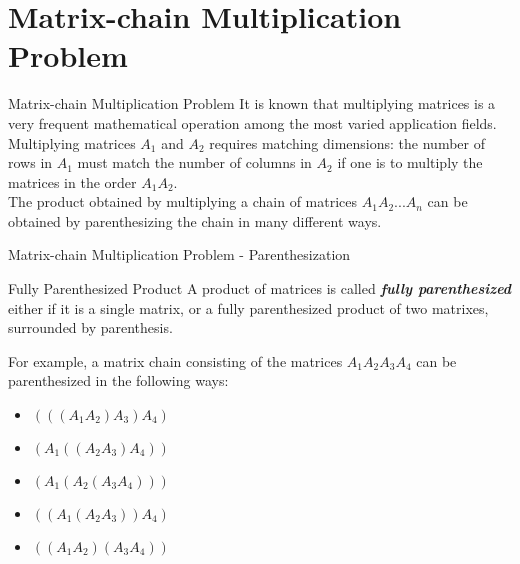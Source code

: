 \section{Matrix-chain Multiplication Problem}


\begin{frame}{Matrix-chain Multiplication Problem}
  It is known that multiplying matrices is a very frequent mathematical
  operation among the most varied application fields. Multiplying matrices 
  $A_1$ and $A_2$ requires matching dimensions: the number of rows in $A_1$
  must match the number of columns in $A_2$ if one is to multiply the matrices 
  in the order $A_{1}A_{2}$.
  \\
  \vspace{2em}
  The product obtained by multiplying a chain of matrices $A_{1}A_{2}...A_{n}$ 
  can be obtained by parenthesizing the chain in many different ways.
\end{frame}


\begin{frame}{Matrix-chain Multiplication Problem - Parenthesization}
  \begin{block}{Fully Parenthesized Product}
    A product of matrices is called \textbf{\emph{fully parenthesized}}
    either if it is a single matrix, or a fully parenthesized product of two matrixes, 
    surrounded by parenthesis.
  \end{block}
  \pause
  For example, a matrix chain consisting of the matrices $A_{1}A_{2}A_{3}A_{4}$ can be
  parenthesized in the following ways:
  \begin{itemize}
    \item $(((A_{1}A_{2})A_{3})A_{4})$
    \item $(A_{1}((A_{2}A_{3})A_{4}))$
    \item $(A_{1}(A_{2}(A_{3}A_{4})))$
    \item $((A_{1}(A_{2}A_{3}))A_{4})$
    \item $((A_{1}A_{2})(A_{3}A_{4}))$
  \end{itemize}
\end{frame}

